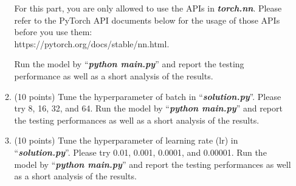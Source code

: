 \documentclass[11pt]{article}
\begin{document}
\begin{enumerate}
\begin{enumerate}
    For this part, you are only allowed to use the APIs in
    \emph{\textbf{torch.nn}}. Please refer to the PyTorch API
    documents below for the usage of those APIs before you use
    them: \\
    https://pytorch.org/docs/stable/nn.html.

    Run the model by ``\emph{\textbf{python main.py}}'' and
    report the testing performance as well as a short analysis of
    the results.


    \item (10 points) Tune the hyperparameter of batch in ``\emph{\textbf{solution.py}}''. Please try 8, 16, 32, and 64. Run the model by
    ``\emph{\textbf{python main.py}}'' and report the testing
    performances as well as a short analysis of the results.


    \item (10 points) Tune the hyperparameter of learning rate (lr) in ``\emph{\textbf{solution.py}}''. Please try 0.01, 0.001, 0.0001, and 0.00001. 
    Run the model by ``\emph{\textbf{python main.py}}'' and
    report the testing performances as well as a short analysis of
    the results.

    
    \end{enumerate}
\end{enumerate}
\end{document}
